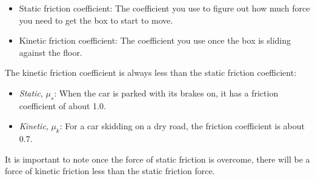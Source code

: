 \begin{itemize}
    \item {}Static friction coefficient: The coefficient you use to figure out how much force you need to get the box to start to move.
\item {}Kinetic friction coefficient: The coefficient you use once the box is sliding against the floor.
\end{itemize}

The kinetic friction coefficient is always less than the static friction coefficient:
\begin{itemize}
    \item \textit{Static}, $\mu_s$: When the car is parked with its brakes on, it has a friction coefficient of about 1.0. 
\item \textit{Kinetic}, $\mu_k$: For a car skidding on a dry road, the friction coefficient is about 0.7. 
\end{itemize}

It is important to note once the force of static friction is overcome, there will be a force of kinetic friction less than the static friction force.

